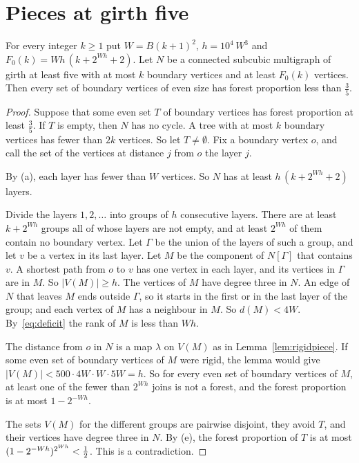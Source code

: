 \documentclass[11pt]{article}
\begin{document}
\section{Pieces at girth five}\label{sec:pieces}

\begin{theorem}\label{thm:base}
For every integer $k\ge1$ put $W=B(k+1)^{2}$, $h=10^{4}\,W^{3}$ and
$F_0(k)=Wh\,(k+2^{Wh}+2)$. Let $N$ be a connected subcubic multigraph of girth at least five with
at most $k$ boundary vertices and at least $F_0(k)$ vertices. Then every set of boundary vertices
of even size has forest proportion less than $\frac35$.
\end{theorem}

\begin{proof}
Suppose that some even set $T$ of boundary vertices has forest proportion at least $\frac35$.
If $T$ is empty, then $N$ has no cycle. A tree with at most $k$ boundary vertices has fewer than
$2k$ vertices. So let $T\ne\emptyset$. Fix a boundary vertex $o$, and call the set of the
vertices at distance $j$ from $o$ the layer $j$.

 By (a), each layer has fewer than $W$ vertices. So $N$ has at least
$h\,(k+2^{Wh}+2)$ layers.

 Divide the layers $1,2,\dots$ into groups of $h$ consecutive layers. There are
at least $k+2^{Wh}$ groups all of whose layers are not empty, and at least $2^{Wh}$ of them
contain no boundary vertex. Let $\Gamma$ be the union of the layers of such a group, and let $v$
be a vertex in its last layer. Let $M$ be the component of $N[\Gamma]$ that contains $v$. A
shortest path from $o$ to $v$ has one vertex in each layer, and its vertices in $\Gamma$ are in
$M$. So $|V(M)|\ge h$. The vertices of $M$ have degree three in $N$. An edge of $N$ that leaves
$M$ ends outside $\Gamma$, so it starts in the first or in the last layer of the group; and each
vertex of $M$ has a neighbour in $M$. So $d(M)<4W$. By~\eqref{eq:deficit} the rank of $M$ is
less than $Wh$.

 The distance from $o$ in $N$ is a map $\lambda$ on $V(M)$ as in
Lemma~\ref{lem:rigidpiece}. If some even set of boundary vertices of $M$ were rigid, the lemma
would give $|V(M)|<500\cdot4W\cdot W\cdot5W=h$. So for every even set of boundary vertices of
$M$, at least one of the fewer than $2^{Wh}$ joins is not a forest, and the forest proportion is
at most $1-2^{-Wh}$.

 The sets $V(M)$ for the different groups are pairwise disjoint, they avoid $T$,
and their vertices have degree three in $N$. By (e), the forest proportion of $T$ is at most
$(1-2^{-Wh})^{2^{Wh}}<\tfrac12$. This is a contradiction.
\end{proof}
\end{document}
